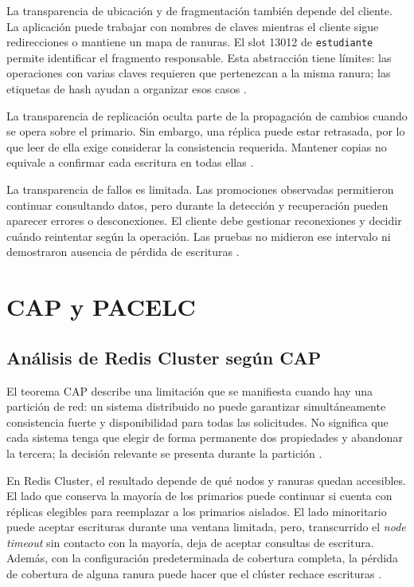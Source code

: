 \documentclass[12pt,a4paper]{article}
\begin{document}
La transparencia de ubicación y de fragmentación también depende del cliente. La aplicación puede trabajar con nombres de claves mientras el cliente sigue redirecciones o mantiene un mapa de ranuras. El slot 13012 de \texttt{estudiante} permite identificar el fragmento responsable. Esta abstracción tiene límites: las operaciones con varias claves requieren que pertenezcan a la misma ranura; las etiquetas de hash ayudan a organizar esos casos \cite{redisClusterSpec}.

La transparencia de replicación oculta parte de la propagación de cambios cuando se opera sobre el primario. Sin embargo, una réplica puede estar retrasada, por lo que leer de ella exige considerar la consistencia requerida. Mantener copias no equivale a confirmar cada escritura en todas ellas \cite{redisReplication}.

La transparencia de fallos es limitada. Las promociones observadas permitieron continuar consultando datos, pero durante la detección y recuperación pueden aparecer errores o desconexiones. El cliente debe gestionar reconexiones y decidir cuándo reintentar según la operación. Las pruebas no midieron ese intervalo ni demostraron ausencia de pérdida de escrituras \cite{redisClusterScaling}.

\section{CAP y PACELC}

\subsection{Análisis de Redis Cluster según CAP}

El teorema CAP describe una limitación que se manifiesta cuando hay una partición de red: un sistema distribuido no puede garantizar simultáneamente consistencia fuerte y disponibilidad para todas las solicitudes. No significa que cada sistema tenga que elegir de forma permanente dos propiedades y abandonar la tercera; la decisión relevante se presenta durante la partición \cite{gilbert2002brewer}.

En Redis Cluster, el resultado depende de qué nodos y ranuras quedan accesibles. El lado que conserva la mayoría de los primarios puede continuar si cuenta con réplicas elegibles para reemplazar a los primarios aislados. El lado minoritario puede aceptar escrituras durante una ventana limitada, pero, transcurrido el \textit{node timeout} sin contacto con la mayoría, deja de aceptar consultas de escritura. Además, con la configuración predeterminada de cobertura completa, la pérdida de cobertura de alguna ranura puede hacer que el clúster rechace escrituras \cite{redisClusterSpec,redisClusterScaling}.
\end{document}
